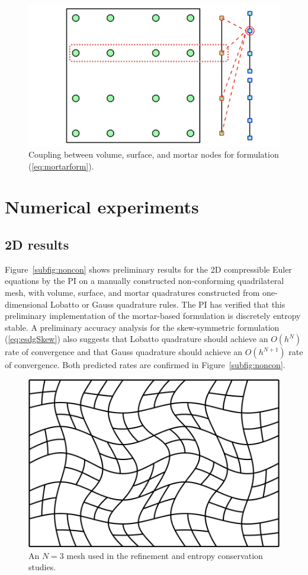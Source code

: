 \documentclass{svjour3}                     %
\begin{document}
\begin{figure}
\centering
\includegraphics[width=.55\textwidth]{mortar_coupling.png}
\caption{Coupling between volume, surface, and mortar nodes for formulation (\ref{eq:mortarform}).}
\end{figure}


\section{Numerical experiments}


\subsection{2D results}
Figure~\ref{subfig:noncon} shows preliminary results for the 2D compressible Euler equations by the PI on a manually constructed non-conforming quadrilateral mesh, with volume, surface, and mortar quadratures constructed from one-dimensional Lobatto or Gauss quadrature rules.  The PI has verified that this preliminary implementation of the mortar-based formulation is discretely entropy stable.  A preliminary accuracy analysis for the skew-symmetric formulation (\ref{eq:esdgSkew}) also suggests that Lobatto quadrature should achieve an $O(h^N)$ rate of convergence and that Gauss quadrature should achieve an $O(h^{N+1})$ rate of convergence.  Both predicted rates are confirmed in Figure~\ref{subfig:noncon}.

\begin{figure}
\centering
\includegraphics[width=.55\textwidth]{figs/noncon_curved_mesh.png}
\caption{An $N=3$ mesh used in the refinement and entropy conservation studies.}
\end{figure}
\end{document}
